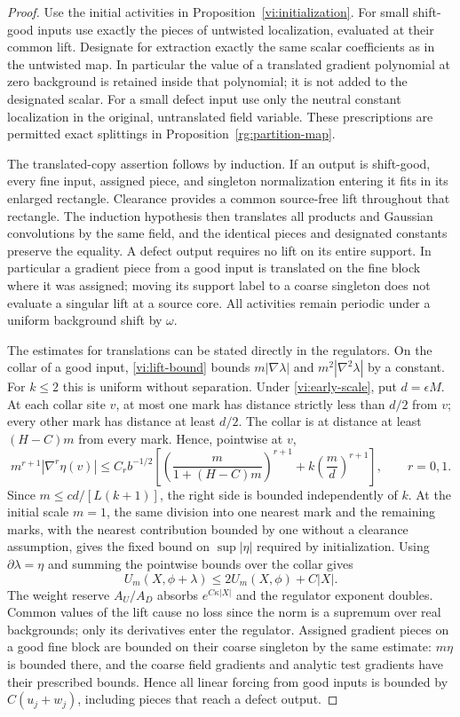 \begin{proof}
Use the initial activities in Proposition~\ref{vi:initialization}.  For
small shift-good inputs use exactly the pieces of untwisted localization,
evaluated at their common lift.  Designate for extraction exactly the
same scalar coefficients as in the untwisted map.  In particular the
value of a translated gradient polynomial at zero background is retained
inside that polynomial; it is not added to the designated scalar.
For a small defect input use only the neutral constant localization in
the original, untranslated field variable.  These prescriptions are
permitted exact splittings in Proposition~\ref{rg:partition-map}.

The translated-copy assertion follows by induction.  If an output is
shift-good, every fine input, assigned piece, and singleton
normalization entering it fits in its enlarged rectangle.  Clearance
provides a common source-free lift throughout that rectangle.  The
induction hypothesis then translates all products and Gaussian
convolutions by the same field, and the identical pieces and designated
constants preserve the equality.  A defect output requires no lift on
its entire support.  In particular a gradient piece from a good input
is translated on the fine block where it was assigned; moving its
support label to a coarse singleton does not evaluate a singular lift
at a source core.  All activities remain periodic under a uniform
background shift by $\omega$.

The estimates for translations can be stated directly in the regulators.
On the collar of a good input, \eqref{vi:lift-bound} bounds
$m|\nabla\lambda|$ and $m^2|\nabla^2\lambda|$ by a constant.  For
$k\le2$ this is uniform without separation.  Under
\eqref{vi:early-scale}, put $d=\epsilon M$.  At each collar site $v$,
at most one mark has distance strictly less than $d/2$ from $v$; every
other mark has distance at least $d/2$.  The collar is at distance at
least $(H-C)m$ from every mark.  Hence, pointwise at $v$,
\[
 m^{r+1}|\nabla^r\eta(v)|
 \le C_r b^{-1/2}\left[
 \left(\frac{m}{1+(H-C)m}\right)^{r+1}
       +k\left(\frac{m}{d}\right)^{r+1}\right],
 \qquad r=0,1.
\]
Since $m\le cd/[L(k+1)]$, the right side is bounded independently of
$k$.  At the initial scale $m=1$, the same division into one nearest mark
and the remaining marks, with the nearest contribution bounded by one
without a clearance assumption,
gives the fixed bound on $\sup|\eta|$ required by initialization.
Using $\partial\lambda=\eta$ and summing the pointwise bounds over the
collar gives
\[
 U_m(X,\phi+\lambda)\le2U_m(X,\phi)+C|X|.
\]
The weight reserve $A_U/A_D$ absorbs $e^{C\kappa|X|}$ and the regulator
exponent doubles.  Common values of the lift cause no loss since the
norm is a supremum over real backgrounds; only its derivatives enter
the regulator.  Assigned gradient pieces on a good fine block are
bounded on their coarse singleton by the same estimate: $m\eta$ is
bounded there, and the coarse field gradients and analytic test
gradients have their prescribed bounds.  Hence all linear forcing from
good inputs is bounded by $C(u_j+w_j)$, including pieces that reach a
defect output.


\end{proof}

